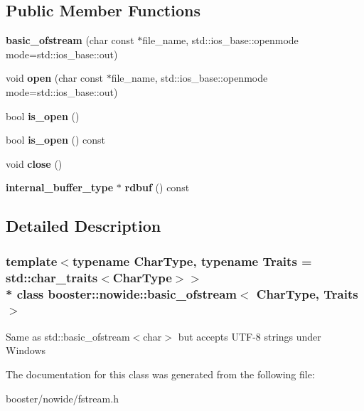 \subsection*{Public Member Functions}
\begin{DoxyCompactItemize}
\item 
{\bfseries basic\+\_\+ofstream} (char const $\ast$file\+\_\+name, std\+::ios\+\_\+base\+::openmode mode=std\+::ios\+\_\+base\+::out)\label{classbooster_1_1nowide_1_1basic__ofstream_ad179dbb18e7d03ac16e49860b53d8d06}

\item 
void {\bfseries open} (char const $\ast$file\+\_\+name, std\+::ios\+\_\+base\+::openmode mode=std\+::ios\+\_\+base\+::out)\label{classbooster_1_1nowide_1_1basic__ofstream_a7c0bbc97ff23f14759536c32777a643f}

\item 
bool {\bfseries is\+\_\+open} ()\label{classbooster_1_1nowide_1_1basic__ofstream_aee64c68ef40f50491942f3b67bb25d3c}

\item 
bool {\bfseries is\+\_\+open} () const \label{classbooster_1_1nowide_1_1basic__ofstream_afbaf63149f90c1f8b07dd00d602f8470}

\item 
void {\bfseries close} ()\label{classbooster_1_1nowide_1_1basic__ofstream_ad7b1e793f9519061b9afca86e6eb587d}

\item 
{\bf internal\+\_\+buffer\+\_\+type} $\ast$ {\bfseries rdbuf} () const \label{classbooster_1_1nowide_1_1basic__ofstream_a339a5fe76e56123ae0095ca98f016866}

\end{DoxyCompactItemize}


\subsection{Detailed Description}
\subsubsection*{template$<$typename Char\+Type, typename Traits = std\+::char\+\_\+traits$<$\+Char\+Type$>$$>$\\*
class booster\+::nowide\+::basic\+\_\+ofstream$<$ Char\+Type, Traits $>$}

Same as std\+::basic\+\_\+ofstream$<$char$>$ but accepts U\+T\+F-\/8 strings under Windows 

The documentation for this class was generated from the following file\+:\begin{DoxyCompactItemize}
\item 
booster/nowide/fstream.\+h\end{DoxyCompactItemize}
